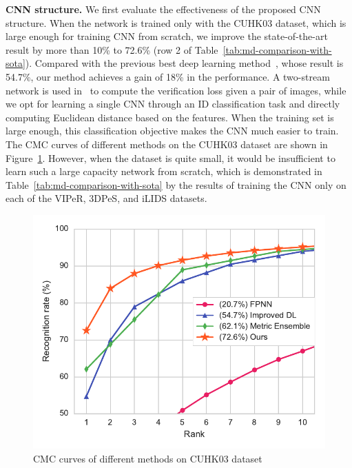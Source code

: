 \textbf{CNN structure.} We first evaluate the effectiveness of the proposed CNN structure. When the network is trained only with the CUHK03 dataset, which is large enough for training CNN from scratch, we improve the state-of-the-art result by more than 10\% to 72.6\% (row 2 of Table~\ref{tab:md-comparison-with-sota}). Compared with the previous best deep learning method~\cite{ahmed2015improved}, whose result is 54.7\%, our method achieves a gain of 18\% in the performance. A two-stream network is used in~\cite{ahmed2015improved} to compute the verification loss given a pair of images, while we opt for learning a single CNN through an ID classification task and directly computing Euclidean distance based on the features. When the training set is large enough, this classification objective makes the CNN much easier to train. The CMC curves of different methods on the CUHK03 dataset are shown in Figure~\ref{fig:md-cmc-cuhk03}. However, when the dataset is quite small, it would be insufficient to learn such a large capacity network from scratch, which is demonstrated in Table~\ref{tab:md-comparison-with-sota} by the results of training the CNN only on each of the VIPeR, 3DPeS, and iLIDS datasets.

\begin{figure}[t]
\begin{center}
\includegraphics[width=1.0\linewidth]{figures/multi_domain/cmc_cuhk03.pdf}
\end{center}
\caption{CMC curves of different methods on CUHK03 dataset}
\label{fig:md-cmc-cuhk03}
\end{figure}

